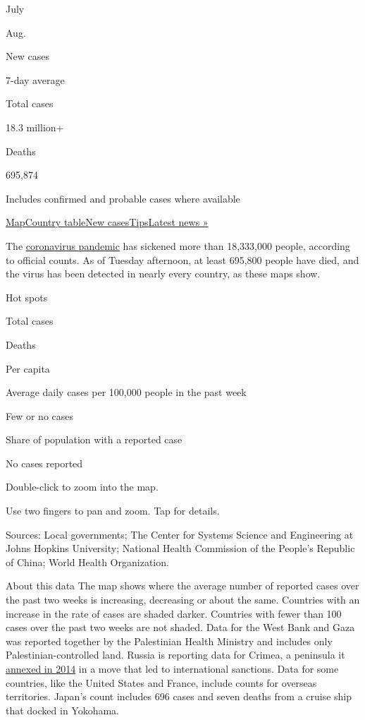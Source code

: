 July

Aug.

New cases

7-day average

Total cases

18.3 million+

Deaths

695,874

Includes confirmed and probable cases where available

\protect\hyperlink{map}{Map}\protect\hyperlink{countries}{Country
table}\protect\hyperlink{cases}{New
cases}\protect\hyperlink{tips}{Tips}\href{https://www.nytimes.com/2020/08/04/world/coronavirus-covid-19.html}{Latest
news »}

The
\href{https://www.nytimes.com/article/prepare-for-coronavirus.html}{coronavirus
pandemic} has sickened more than 18,333,000 people, according to
official counts. As of Tuesday afternoon, at least 695,800 people have
died, and the virus has been detected in nearly every country, as these
maps show.

Hot spots

Total cases

Deaths

Per capita

Average daily cases per 100,000 people in the past week

Few or no cases

Share of population with a reported case

No cases reported

Double-click to zoom into the map.

Use two fingers to pan and zoom. Tap for details.

Sources: Local governments; The Center for Systems Science and
Engineering at Johns Hopkins University; National Health Commission of
the People's Republic of China; World Health Organization.

About this data The map shows where the average number of reported cases
over the past two weeks is increasing, decreasing or about the same.
Countries with an increase in the rate of cases are shaded darker.
Countries with fewer than 100 cases over the past two weeks are not
shaded. Data for the West Bank and Gaza was reported together by the
Palestinian Health Ministry and includes only Palestinian-controlled
land. Russia is reporting data for Crimea, a peninsula it
\href{https://www.nytimes.com/2014/03/19/world/europe/ukraine.html}{annexed
in 2014} in a move that led to international sanctions. Data for some
countries, like the United States and France, include counts for
overseas territories. Japan's count includes 696 cases and seven deaths
from a cruise ship that docked in Yokohama.

